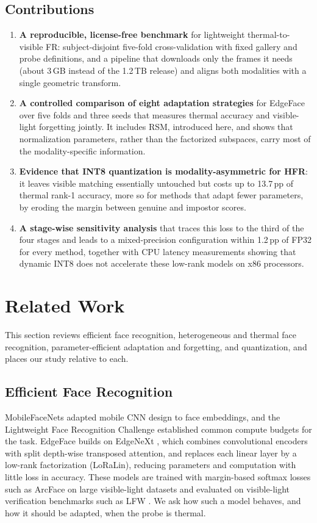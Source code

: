 \documentclass[journal]{IEEEtran}
\begin{document}
\subsection{Contributions}
\begin{enumerate}
  \item \textbf{A reproducible, license-free benchmark} for lightweight thermal-to-visible FR: subject-disjoint five-fold cross-validation with fixed gallery and probe definitions, and a pipeline that downloads only the frames it needs (about 3\,GB instead of the 1.2\,TB release) and aligns both modalities with a single geometric transform.
  \item \textbf{A controlled comparison of eight adaptation strategies} for EdgeFace over five folds and three seeds that measures thermal accuracy and visible-light forgetting jointly. It includes RSM, introduced here, and shows that normalization parameters, rather than the factorized subspaces, carry most of the modality-specific information.
  \item \textbf{Evidence that INT8 quantization is modality-asymmetric for HFR}: it leaves visible matching essentially untouched but costs up to 13.7\,pp of thermal rank-1 accuracy, more so for methods that adapt fewer parameters, by eroding the margin between genuine and impostor scores.
  \item \textbf{A stage-wise sensitivity analysis} that traces this loss to the third of the four stages and leads to a mixed-precision configuration within 1.2\,pp of FP32 for every method, together with CPU latency measurements showing that dynamic INT8 does not accelerate these low-rank models on x86 processors.
\end{enumerate}

\section{Related Work}
\label{sec:related}
This section reviews efficient face recognition, heterogeneous and thermal face recognition, parameter-efficient adaptation and forgetting, and quantization, and places our study relative to each.

\subsection{Efficient Face Recognition}
MobileFaceNets \cite{chen2018mobilefacenets} adapted mobile CNN design to face embeddings, and the Lightweight Face Recognition Challenge \cite{deng2019lightweight} established common compute budgets for the task. EdgeFace \cite{george2024edgeface} builds on EdgeNeXt \cite{maaz2022edgenext}, which combines convolutional encoders with split depth-wise transposed attention, and replaces each linear layer by a low-rank factorization (LoRaLin), reducing parameters and computation with little loss in accuracy. These models are trained with margin-based softmax losses such as ArcFace \cite{deng2019arcface} on large visible-light datasets and evaluated on visible-light verification benchmarks such as LFW \cite{huang2007lfw}. We ask how such a model behaves, and how it should be adapted, when the probe is thermal.
\end{document}
